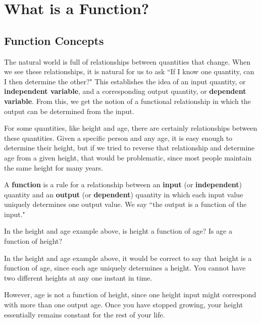 \section{What is a Function?}
\label{sec:functions}

\subsection{Function Concepts}

The natural world is full of relationships between quantities that change. When we see these
relationships, it is natural for us to ask ``If I know one quantity, can I then determine the other?" This establishes the idea of an input quantity, or {\bf independent variable}, and a corresponding output quantity, or {\bf dependent variable}. From this, we get the notion of a functional relationship in which the output can be determined from the input.

For some quantities, like height and age, there are certainly relationships between these
quantities. Given a specific person and any age, it is easy enough to determine their height, but if we tried to reverse that relationship and determine age from a given height, that would be problematic, since most people maintain the same height for many years.

\begin{definition}
A {\bf function} is a rule for a relationship between an {\bf input} (or {\bf independent}) quantity and an {\bf output} (or {\bf dependent}) quantity in which each input value uniquely determines one output value. We say ``the output is a function of the input."
\end{definition}

\begin{example}
\label{ex:height}
In the height and age example above, is height a function of age? Is age a function of height?

\solution In the height and age example above, it would be correct to say that height is a function of age, since each age uniquely determines a height. You cannot have two different heights at any one instant in time.

However, age is not a function of height, since one height input might correspond with more than one output age. Once you have stopped growing, your height essentially remains constant for the rest of your life.
\end{example}


